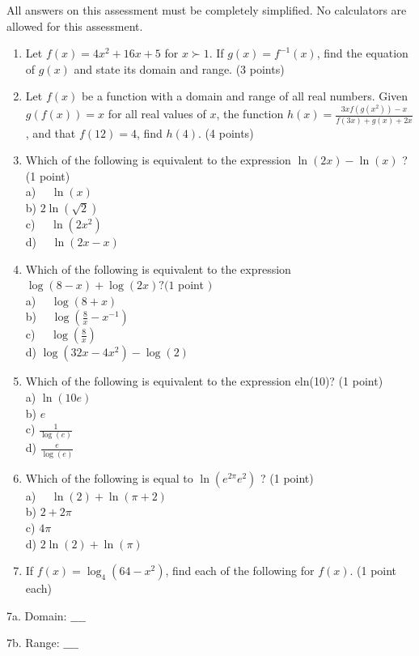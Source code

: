 \documentclass[10pt]{article}
\begin{document}
All answers on this assessment must be completely simplified. No calculators are allowed for this assessment.

\begin{enumerate}
  \item Let $f(x)=4 x^{2}+16 x+5$ for $x \succ 1$. If $g(x)=f^{-1}(x)$, find the equation of $g(x)$ and state its domain and range. (3 points)
  \item Let $f(x)$ be a function with a domain and range of all real numbers. Given $g(f(x))=x$ for all real values of $x$, the function $h(x)=\frac{3 x f\left(g\left(x^{2}\right)\right)-x}{f(3 x)+g(x)+2 x}$, and that $f(12)=4$, find $h(4)$. (4 points)
  \item Which of the following is equivalent to the expression $\ln (2 x)-\ln (x)$ ? (1 point)\\
a) $\quad \ln (x)$\\
b) $2 \ln (\sqrt{2})$\\
c) $\quad \ln \left(2 x^{2}\right)$\\
d) $\quad \ln (2 x-x)$
  \item Which of the following is equivalent to the expression $\log (8-x)+\log (2 x) ?(1$ point $)$\\
a) $\quad \log (8+x)$\\
b) $\quad \log \left(\frac{8}{x}-x^{-1}\right)$\\
c) $\quad \log \left(\frac{8}{x}\right)$\\
d) $\log \left(32 x-4 x^{2}\right)-\log (2)$
  \item Which of the following is equivalent to the expression eln(10)? (1 point)\\
a) $\ln (10 e)$\\
b) $e$\\
c) $\frac{1}{\log (e)}$\\
d) $\frac{e}{\log (e)}$
  \item Which of the following is equal to $\ln \left(e^{2 \pi} e^{2}\right)$ ? (1 point)\\
a) $\quad \ln (2)+\ln (\pi+2)$\\
b) $2+2 \pi$\\
c) $4 \pi$\\
d) $2 \ln (2)+\ln (\pi)$
  \item If $f(x)=\log _{4}\left(64-x^{2}\right)$, find each of the following for $f(x)$. (1 point each)
\end{enumerate}

7a. Domain: $\_\_\_\_$

7b. Range: $\_\_\_\_$
\end{document}
